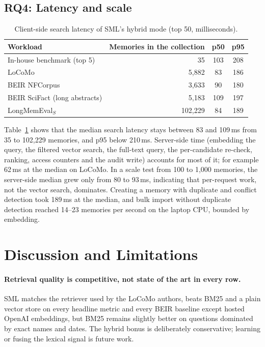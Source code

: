 \documentclass[11pt,a4paper]{article}
\newcommand{\sys}{SML}
\begin{document}
\subsection{RQ4: Latency and scale}

\begin{table}[htbp]
\centering
\small
\caption{Client-side search latency of \sys{}'s hybrid mode (top 50, milliseconds).}
\label{tab:latency}
\begin{tabular}{@{}lrcc@{}}
\toprule
Workload & Memories in the collection & p50 & p95 \\
\midrule
In-house benchmark (top 5) & 35 & 103 & 208 \\
LoCoMo & 5{,}882 & 83 & 186 \\
BEIR NFCorpus & 3{,}633 & 90 & 180 \\
BEIR SciFact (long abstracts) & 5{,}183 & 109 & 197 \\
LongMemEval$_S$ & 102{,}229 & 84 & 189 \\
\bottomrule
\end{tabular}
\end{table}

Table~\ref{tab:latency} shows that the median search latency stays between 83 and 109\,ms from 35 to
102{,}229 memories, and p95 below 210\,ms. Server-side time (embedding the query, the filtered vector search,
the full-text query, the per-candidate re-check, ranking, access counters and the audit write) accounts for
most of it; for example 62\,ms at the median on LoCoMo. In a scale test from 100 to 1{,}000 memories, the
server-side median grew only from 80 to 93\,ms, indicating that per-request work, not the vector search,
dominates. Creating a memory with duplicate and conflict detection took 189\,ms at the median, and bulk import
without duplicate detection reached 14--23 memories per second on the laptop CPU, bounded by embedding.

\section{Discussion and Limitations}
\label{sec:discussion}

\paragraph{Retrieval quality is competitive, not state of the art in every row.} \sys{} matches the retriever
used by the LoCoMo authors, beats BM25 and a plain vector store on every headline metric and every BEIR
baseline except hosted OpenAI embeddings, but BM25 remains slightly better on questions dominated by exact
names and dates. The hybrid bonus is deliberately conservative; learning or fusing the lexical signal is future
work.
\end{document}
